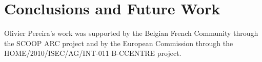 \documentclass[jets]{usenixjournal}
\begin{document}
\section{Conclusions and Future Work}


\begin{acks}
  Olivier Pereira's work was supported by the Belgian French Community
  through the SCOOP ARC project and by the European Commission through
  the HOME/2010/ISEC/AG/INT-011 B-CCENTRE project.
\end{acks}



\end{document}
